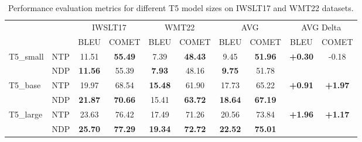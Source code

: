 \begin{table}[ht]
    \centering %
    \begin{tabular}{llcccccccc} %
        \toprule %
        & & \multicolumn{2}{c}{IWSLT17} & \multicolumn{2}{c}{WMT22} & \multicolumn{2}{c}{AVG} & \multicolumn{2}{c}{AVG Delta} \\
        \cmidrule(r){3-4} \cmidrule(r){5-6} \cmidrule(r){7-8} \cmidrule(r){9-10} %
        & & BLEU & COMET & BLEU & COMET & BLEU & COMET & BLEU & COMET \\
        \midrule %
        \multirow{2}{*}{T5\_small} 
        & NTP & 11.51 & \textbf{55.49}& 7.39 & \textbf{48.43}& 9.45 & \textbf{51.96} & \multirow{2}{*}{\textbf{+0.30}} & \multirow{2}{*}{-0.18} \\
        & NDP & \textbf{11.56}& 55.39 & \textbf{7.93}& 48.16 & \textbf{9.75} & 51.78 &  &  \\
        \midrule %
        \multirow{2}{*}{T5\_base} 
        & NTP & 19.97 & 68.54 & \textbf{15.48}& 61.90 & 17.73 & 65.22 & \multirow{2}{*}{\textbf{+0.91}} & \multirow{2}{*}{\textbf{+1.97}} \\
        & NDP & \textbf{21.87}& \textbf{70.66}& 15.41 & \textbf{63.72}& \textbf{18.64} & \textbf{67.19} &  &  \\
        \midrule %
        \multirow{2}{*}{T5\_large} 
        & NTP & 23.63 & 76.42 & 17.49 & 71.26 & 20.56 & 73.84 & \multirow{2}{*}{\textbf{+1.96}} & \multirow{2}{*}{\textbf{+1.17}} \\
        & NDP & \textbf{25.70}& \textbf{77.29}& \textbf{19.34}& \textbf{72.72}& \textbf{22.52} & \textbf{75.01} &  &  \\
        \bottomrule %
    \end{tabular}
    \caption{Performance evaluation metrics for different T5 model sizes on IWSLT17 and WMT22 datasets.} %
    \label{tab:performance} %
\end{table}
